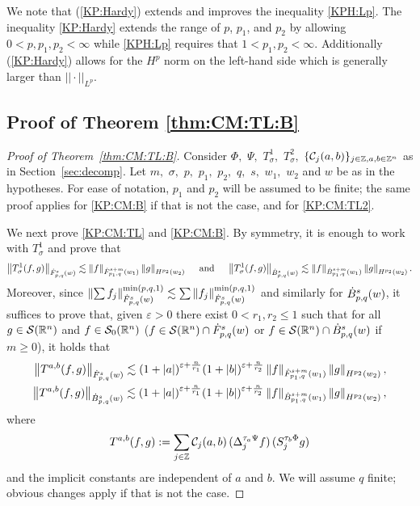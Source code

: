 We note that (\ref{KP:Hardy}) extends and improves the inequality \eqref{KPH:Lp}. The inequality \eqref{KP:Hardy} extends the range of $p$, $p_1$, and $p_2$ by allowing $0<p,p_1,p_2<\infty$ while \eqref{KPH:Lp} requires that $1<p_1,p_2<\infty$. Additionally (\ref{KP:Hardy}) allows for the $H^p$ norm on the left-hand side which is generally larger than $||\cdot||_{L^p}$. 
 
 
 \subsection{Proof of Theorem \ref{thm:CM:TL:B}}
 
 \begin{proof}[Proof of Theorem~\ref{thm:CM:TL:B}] Consider $\Phi,$ $\Psi,$ $T_\sigma^1,$ $T_\sigma^2,$ $\{\C_j(a,b)\}_{j\in\ent,a,b\in\ent^n}$ as in Section~\ref{sec:decomp}. Let $m,$ $\sigma,$ $p,$ $p_1,$ $p_2,$ $q,$ $s,$ $w_1,$ $w_2$ and $w$ be as in the hypotheses.  
For ease of notation, $p_1$ and $p_2$ will be assumed to be finite; the same proof applies for \eqref{KP:CM:B} if that is not the case, and for \eqref{KP:CM:TL2}.


We next prove \eqref{KP:CM:TL} and \eqref{KP:CM:B}. 
 By symmetry,  it is enough to work with $T_\sigma^1$ and prove that 
 \begin{align*}
 \norm{T^{1}_\sigma(f,g)}{\dot{F}^s_{p,q}(w)} \lesssim  \norm{f}{\dot{F}^{s+m}_{p_1, q}(w_1)} \norm{g}{H^{p_2}(w_2)}\quad  \text{ and }\quad 
 \norm{T^1_\sigma(f,g)}{\dot{B}^s_{p,q}(w)} \lesssim  \norm{f}{\dot{B}^{s+m}_{p_1, q}(w_1)} \norm{g}{H^{p_2}(w_2)}.
\end{align*}
  Moreover, since $\norm{\sum f_j}{\tlw{p}{s}{q}{w}}^{\min(p,q,1)}\lesssim \sum\norm{f_j}{\tlw{p}{s}{q}{w}}^{\min(p,q,1)}$  and similarly for $\besw{p}{s}{q}{w}$, it suffices to prove that, given $\varepsilon>0$ there exist $0<r_1,r_2\le 1$  such that for all $g\in \sw$ and  $f\in \swz$ ($f\in \sw\cap \tlw{p}{s}{q}{w}$ or  $f\in \sw\cap \besw{p}{s}{q}{w}$ if $m\ge 0$),  it holds that
\begin{align}
 \norm{T^{a,b}(f,g)}{\dot{F}^s_{p,q}(w)} \lesssim (1+\abs{a})^{\varepsilon+\frac{n}{r_1}}  (1+\abs{b})^{\varepsilon+\frac{n}{r_2}} \norm{f}{\dot{F}^{s+m}_{p_1, q}(w_1)} \norm{g}{H^{p_2}(w_2)}\label{eq:estbbTL},\\
 \norm{T^{a,b}(f,g)}{\dot{B}^s_{p,q}(w)} \lesssim (1+\abs{a})^{\varepsilon+\frac{n}{r_1}}  (1+\abs{b})^{\varepsilon+\frac{n}{r_2}} \norm{f}{\dot{B}^{s+m}_{p_1, q}(w_1)} \norm{g}{H^{p_2}(w_2)}\label{eq:estbbB},
\end{align}
where
\[
T^{a,b}(f,g):=\sum_{j\in\ent} \C_j(a,b) \,(\Do{ \tau_a \Psi }{j} f)\, (\So{ \tau_b \Phi }{j} g )
\]
and the implicit constants are independent of $a$ and $b.$  We will assume $q$ finite; obvious changes apply if that is not the case.


\end{proof}
